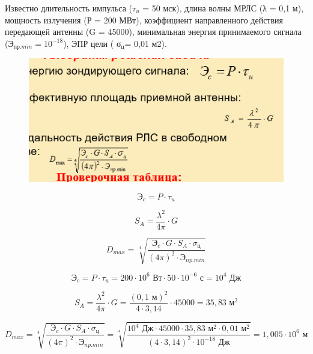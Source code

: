 \documentclass[a4paper,14pt]{article}
\begin{document}

\tableofcontents
\pagebreak

Известно длительность импульса ($\tau_u$ = 50 мск), длина волны МРЛС (λ = 0,1 м), мощность излучения (Р = 200 МВт), коэффициент направленного действия передающей антенны (G = 45000), минимальная энергия принимаемого сигнала (Э$_{пр.min} = 10^{-18}$),  ЭПР цели ( σ$_{ц}$= 0,01 м2).
\begin{figure}[H]
	\centering
	\includegraphics[width=1\linewidth]{screenshot001}
	\caption{}
	\label{fig:screenshot001}
\end{figure}

$$\text{Э}_c = P \cdot \tau_u$$

$$S_A = \dfrac{\lambda^2}{4\pi}\cdot G$$

$$D_{max} = \sqrt[4]{\dfrac{\text{Э}_c \cdot G \cdot S_A \cdot \sigma_{\text{ц}}}{(4\pi)^2 \cdot  \text{Э}_{np.min}}} $$

\pagebreak


$$\text{Э}_c = P \cdot \tau_u = 200 \cdot 10^{6} \text{ Вт} \cdot 50 \cdot 10^{-6} \text{ с} = 10^4 \text{ Дж}$$

$$S_A = \dfrac{\lambda^2}{4\pi}\cdot G = \dfrac{(0,1 \text{ м} )^2}{4\cdot 3,14}\cdot 45000 = 35,83\text{ м}^2$$

$$D_{max} = \sqrt[4]{\dfrac{\text{Э}_c \cdot G \cdot S_A \cdot \sigma_{\text{ц}}}{(4\pi)^2 \cdot  \text{Э}_{np.min}}} = 
\sqrt[4]{\dfrac{10^4 \text{ Дж} \cdot 45000 \cdot 35,83 \text{ м}^2 \cdot 0,01 \text{ м}^2}{(4 \cdot 3,14)^2 \cdot  10^{-18} \text{ Дж}}} = 
1,005 \cdot 10^6 \text{ м}
$$
\end{document}
